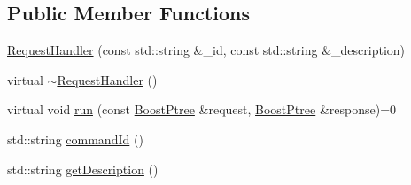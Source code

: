 \subsection*{Public Member Functions}
\begin{DoxyCompactItemize}
\item 
\hyperlink{classkisscpp_1_1_request_handler_a0c726aac7632902905126e5d381dd12e}{Request\-Handler} (const std\-::string \&\-\_\-id, const std\-::string \&\-\_\-description)
\item 
virtual \hyperlink{classkisscpp_1_1_request_handler_afc972ed679cfcc264f8694083be0273e}{$\sim$\-Request\-Handler} ()
\item 
virtual void \hyperlink{classkisscpp_1_1_request_handler_a3606f772c07297826847a8e36226cdaa}{run} (const \hyperlink{boost__ptree_8hpp_ab36820650b8e0db36402aea80485633c}{Boost\-Ptree} \&request, \hyperlink{boost__ptree_8hpp_ab36820650b8e0db36402aea80485633c}{Boost\-Ptree} \&response)=0
\item 
std\-::string \hyperlink{classkisscpp_1_1_request_handler_aa67ecd0d2dc726b1e76ae1e29329aed3}{command\-Id} ()
\item 
std\-::string \hyperlink{classkisscpp_1_1_request_handler_ab0f562cba2b870143c4861f3939e7c3d}{get\-Description} ()
\end{DoxyCompactItemize}



